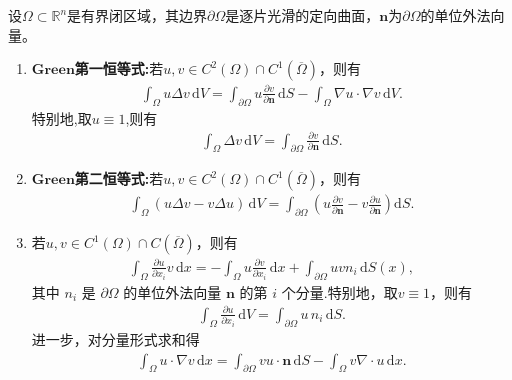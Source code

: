\documentclass[../../main.tex]{subfiles}%
\begin{document}
\begin{theorem}[Green恒等式]\label{theorem:Green恒等式}
设$\Omega\subset\mathbb{R}^n$是有界闭区域，其边界$\partial\Omega$是逐片光滑的定向曲面，$\bm{n}$为$\partial\Omega$的单位外法向量。
\begin{enumerate}[(1)]
\item\label{theorem:Green第一恒等式} $\mathbf{Green}$\textbf{第一恒等式:}若$u,v\in C^2(\Omega)\cap C^1(\overline{\Omega})$，则有
\begin{align*}
\int_{\Omega}u\Delta v\,\mathrm{d}V=\int_{\partial\Omega}u\frac{\partial v}{\partial\bm{n}}\,\mathrm{d}S-\int_{\Omega}\nabla u\cdot\nabla v\,\mathrm{d}V.
\end{align*}
特别地,取$u\equiv 1$,则有
\begin{align*}
\int_{\Omega}\Delta v\,\mathrm{d}V=\int_{\partial\Omega}\frac{\partial v}{\partial\bm{n}}\,\mathrm{d}S.
\end{align*}

\item\label{theorem:Green第二恒等式} $\mathbf{Green}$\textbf{第二恒等式:}若$u,v\in C^2(\Omega)\cap C^1(\overline{\Omega})$，则有
\begin{align*}
\int_{\Omega}(u\Delta v-v\Delta u)\,\mathrm{d}V=\int_{\partial\Omega}\left(u\frac{\partial v}{\partial\bm{n}}-v\frac{\partial u}{\partial\bm{n}}\right)\mathrm{d}S. 
\end{align*}

\item\label{theorem:Green恒等式-3} 若$u,v\in C^1(\Omega)\cap C(\overline{\Omega})$，则有
\begin{align*}
\int_\Omega \frac{\partial u}{\partial x_i}v\,\mathrm{d}x = -\int_\Omega u \frac{\partial v}{\partial x_i}\,\mathrm{d}x + \int_{\partial\Omega} u v n_i\,\mathrm{d}S(x),
\end{align*}
其中 $n_i$ 是 $\partial\Omega$ 的单位外法向量 $\bm{n}$ 的第 $i$ 个分量.特别地，取$v\equiv 1$，则有
\begin{align*}
\int_{\Omega}\frac{\partial u}{\partial x_i}\,\mathrm{d}V=\int_{\partial\Omega}u\,n_i\,\mathrm{d}S. 
\end{align*}
进一步，对分量形式求和得
\begin{align*}
\int_{\Omega} u\cdot \nabla v \,\mathrm{d}x
= \int_{\partial\Omega} v u\cdot \bm{n} \,\mathrm{d}S
- \int_{\Omega} v \nabla\cdot u \,\mathrm{d}x.
\end{align*}
\end{enumerate}
\end{theorem}
\end{document}
